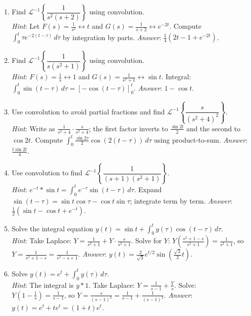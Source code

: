 \documentclass[12pt,a4paper]{article}
\begin{document}
\begin{enumerate}[label=\textbf{P\arabic*.}, leftmargin=*, itemsep=8pt]

\item Find $\mathcal{L}^{-1}\!\left\{\dfrac{1}{s^2(s+2)}\right\}$ using convolution.\\
\textit{Hint}: Let $F(s)=\frac{1}{s^2}\leftrightarrow t$ and $G(s)=\frac{1}{s+2}\leftrightarrow e^{-2t}$.
Compute $\int_0^t \tau e^{-2(t-\tau)}\,d\tau$ by integration by parts.
\textit{Answer}: $\frac{1}{4}\!\left(2t-1+e^{-2t}\right)$.

\item Find $\mathcal{L}^{-1}\!\left\{\dfrac{1}{s(s^2+1)}\right\}$ using convolution.\\
\textit{Hint}: $F(s)=\frac{1}{s}\leftrightarrow 1$ and $G(s)=\frac{1}{s^2+1}\leftrightarrow\sin t$.
Integral: $\int_0^t\sin(t-\tau)\,d\tau=[-\cos(t-\tau)]_0^t$.
\textit{Answer}: $1-\cos t$.

\item Use convolution to avoid partial fractions and find
$\mathcal{L}^{-1}\!\left\{\dfrac{s}{(s^2+4)^2}\right\}$.\\
\textit{Hint}: Write as $\frac{1}{s^2+4}\cdot\frac{s}{s^2+4}$; the first factor inverts to
$\frac{\sin 2t}{2}$ and the second to $\cos 2t$.
Compute $\int_0^t\frac{\sin 2\tau}{2}\cos(2(t-\tau))\,d\tau$ using product-to-sum.
\textit{Answer}: $\frac{t\sin 2t}{4}$.

\item Use convolution to find $\mathcal{L}^{-1}\!\left\{\dfrac{1}{(s+1)(s^2+1)}\right\}$.\\
\textit{Hint}: $e^{-t}*\sin t = \int_0^t e^{-\tau}\sin(t-\tau)\,d\tau$.
Expand $\sin(t-\tau)=\sin t\cos\tau-\cos t\sin\tau$; integrate term by term.
\textit{Answer}: $\frac{1}{2}(\sin t - \cos t + e^{-t})$.

\item Solve the integral equation $y(t)=\sin t + \int_0^t y(\tau)\cos(t-\tau)\,d\tau$.\\
\textit{Hint}: Take Laplace: $Y=\frac{1}{s^2+1}+Y\cdot\frac{s}{s^2+1}$.
Solve for $Y$: $Y\!\left(\frac{s^2+1-s}{s^2+1}\right)=\frac{1}{s^2+1}$,
so $Y=\frac{1}{s^2+1-s}=\frac{1}{s^2-s+1}$.
\textit{Answer}: $y(t)=\frac{2}{\sqrt{3}}e^{t/2}\sin\!\left(\frac{\sqrt{3}}{2}t\right)$.

\item Solve $y(t)=e^t + \int_0^t y(\tau)\,d\tau$.\\
\textit{Hint}: The integral is $y*1$. Take Laplace: $Y=\frac{1}{s-1}+\frac{Y}{s}$.
Solve: $Y\!\left(1-\frac{1}{s}\right)=\frac{1}{s-1}$, so $Y=\frac{s}{(s-1)^2}=\frac{1}{s-1}+\frac{1}{(s-1)^2}$.
\textit{Answer}: $y(t)=e^t+te^t=(1+t)e^t$.

\end{enumerate}
\end{document}
